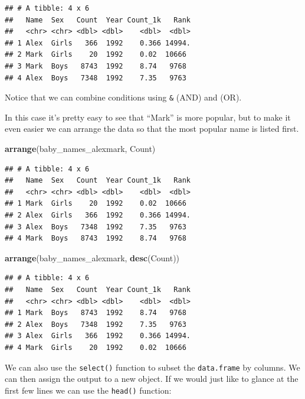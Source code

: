 \documentclass[]{book}
\newenvironment{Shaded}{\begin{snugshade}}{\end{snugshade}}
\newcommand{\KeywordTok}[1]{\textcolor[rgb]{0.13,0.29,0.53}{\textbf{#1}}}
\newcommand{\NormalTok}[1]{#1}
\begin{document}
\begin{verbatim}
## # A tibble: 4 x 6
##   Name  Sex   Count  Year Count_1k   Rank
##   <chr> <chr> <dbl> <dbl>    <dbl>  <dbl>
## 1 Alex  Girls   366  1992    0.366 14994.
## 2 Mark  Girls    20  1992    0.02  10666 
## 3 Mark  Boys   8743  1992    8.74   9768 
## 4 Alex  Boys   7348  1992    7.35   9763
\end{verbatim}

Notice that we can combine conditions using \texttt{\&} (AND)
and \texttt{\textbar{}} (OR).

In this case it's pretty easy to see that ``Mark'' is more popular,
but to make it even easier we can arrange the data so that the
most popular name is listed first.

\begin{Shaded}
\begin{Highlighting}[]
\KeywordTok{arrange}\NormalTok{(baby_names_alexmark, Count)}
\end{Highlighting}
\end{Shaded}

\begin{verbatim}
## # A tibble: 4 x 6
##   Name  Sex   Count  Year Count_1k   Rank
##   <chr> <chr> <dbl> <dbl>    <dbl>  <dbl>
## 1 Mark  Girls    20  1992    0.02  10666 
## 2 Alex  Girls   366  1992    0.366 14994.
## 3 Alex  Boys   7348  1992    7.35   9763 
## 4 Mark  Boys   8743  1992    8.74   9768
\end{verbatim}

\begin{Shaded}
\begin{Highlighting}[]
\KeywordTok{arrange}\NormalTok{(baby_names_alexmark, }\KeywordTok{desc}\NormalTok{(Count))}
\end{Highlighting}
\end{Shaded}

\begin{verbatim}
## # A tibble: 4 x 6
##   Name  Sex   Count  Year Count_1k   Rank
##   <chr> <chr> <dbl> <dbl>    <dbl>  <dbl>
## 1 Mark  Boys   8743  1992    8.74   9768 
## 2 Alex  Boys   7348  1992    7.35   9763 
## 3 Alex  Girls   366  1992    0.366 14994.
## 4 Mark  Girls    20  1992    0.02  10666
\end{verbatim}

We can also use the \texttt{select()} function to subset the \texttt{data.frame}
by columns. We can then assign the output to a new object. If we
would just like to glance at the first few lines we can use the
\texttt{head()} function:
\end{document}
